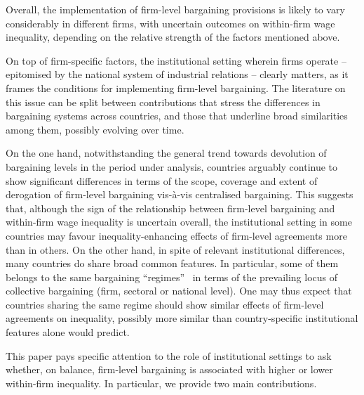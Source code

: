 \documentclass[12pt]{article}
\begin{document}
Overall, the implementation of firm-level bargaining provisions is likely to vary considerably in different firms, with uncertain outcomes on within-firm wage inequality, depending on the relative strength of the factors mentioned above.

On top of firm-specific factors, the institutional setting wherein firms operate -- epitomised by the national system of industrial relations -- clearly matters, as it frames the conditions for implementing firm-level bargaining. The literature on this issue can be split between contributions that stress the differences in bargaining systems across countries, and those that underline broad similarities among them, possibly evolving over time.

On the one hand, notwithstanding the general trend towards devolution of bargaining levels in the period under analysis, countries arguably continue to show significant differences in terms of the scope, coverage and extent of derogation of firm-level bargaining vis-à-vis centralised bargaining. This suggests that, although the sign of the relationship between firm-level bargaining and within-firm wage inequality is uncertain overall, the institutional setting in some countries may favour inequality-enhancing effects of firm-level agreements more than in others. On the other hand, in spite of relevant institutional differences, many countries do share broad common features. In particular, some of them belongs to the same bargaining “regimes”~\citep{fulton.2013} in terms of the prevailing locus of collective bargaining (firm, sectoral or national level). One may thus expect that countries sharing the same regime should show similar effects of firm-level agreements on inequality, possibly more similar than country-specific institutional features alone would predict. 


This paper pays specific attention to the role of institutional settings to ask whether, on balance, firm-level bargaining is associated with higher or lower within-firm inequality. In particular, we provide two main contributions.
\end{document}
